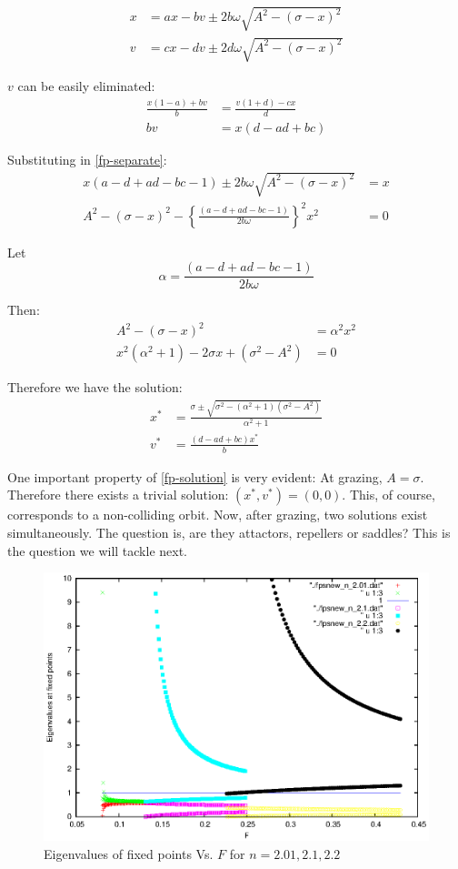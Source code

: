 \documentclass{book}
\renewcommand{\(}{\begin{columns}}
\renewcommand{\)}{\end{columns}}
\newcommand{\<}[1]{\begin{column}{#1}}
\renewcommand{\>}{\end{column}}
\begin{document}
\begin{align}
\label{fp-separate}
x&=ax-bv \pm 2b\omega\sqrt{A^2-(\sigma-x)^2}\\
v&=cx-dv \pm 2d\omega\sqrt{A^2-(\sigma-x)^2}
\end{align}

$v$ can be easily eliminated:
\begin{align*}
\frac{x(1-a)+bv}{b}&=\frac{v(1+d)-cx}{d}\\
bv&=x(d-ad+bc)
\end{align*}

Substituting in \eqref{fp-separate}:
\begin{align*}
x(a-d+ad-bc-1)\pm 2b\omega\sqrt{A^2-(\sigma-x)^2}&=x\\
A^2-(\sigma-x)^2-\left\{\frac{(a-d+ad-bc-1)}{2b\omega}\right\}^2x^2&=0
\end{align*}


Let \[
\alpha=\frac{(a-d+ad-bc-1)}{2b\omega}
\]

Then:
\begin{align*}
A^2-(\sigma-x)^2&=\alpha^2x^2\\
x^2(\alpha^2+1)-2\sigma x+(\sigma^2-A^2)&=0
\end{align*}

Therefore we have the solution:
\begin{align}
\label{fp-solution}
x^*&=\frac{\sigma\pm\sqrt{\sigma^2-(\alpha^2+1)(\sigma^2-A^2)}}{\alpha^2+1}\\
v^*&=\frac{(d-ad+bc)x^*}{b}
\end{align}


One important property of  \eqref{fp-solution} is very evident:
At grazing, $A=\sigma$.  Therefore there exists a trivial solution: 
$(x^*,v^*)=(0,0)$.  This, of course, corresponds to a non-colliding orbit.  
Now, after grazing, two solutions exist simultaneously.  The question is, 
are they attactors, repellers or saddles? This is the question we will tackle 
next.  

\begin{figure}[!htp]
\begin{center}
\caption{Eigenvalues of fixed points Vs.  $F$ for $n=2.01,2.1,2.2$}
\label{fig-eigs-F}
\includegraphics[width=0.7\columnwidth]{fps_various_F}
\end{center}
\end{figure}
\end{document}
